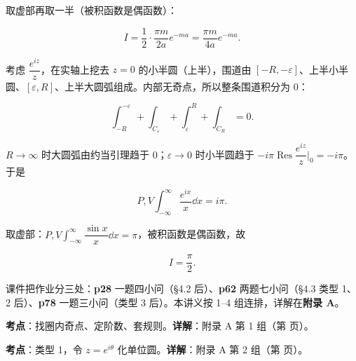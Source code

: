 \documentclass[11pt]{ctexart}
\renewcommand{\qbreak}{\needspace{0.45\textheight}}
\let\orighdr\hdr
\renewcommand{\hdr}[2]{\par\orighdr{#1}{#2}}
\begin{document}
取虚部再取一半（被积函数是偶函数）：

\[ I=\frac12\cdot\frac{\pi m}{2a}e^{-ma}=\frac{\pi m}{4a}e^{-ma} . \]


\qbreak
{}

考虑 $\dfrac{e^{iz}}{z}$，在实轴上挖去 $z=0$ 的小半圆（上半），围道由 $[-R,-\varepsilon]$、上半小半圆、$[\varepsilon,R]$、上半大圆弧组成。内部无奇点，所以整条围道积分为 0：

\[ \int_{-R}^{-\varepsilon}+\int_{C_\varepsilon}+\int_{\varepsilon}^{R}+\int_{C_R}=0 . \]

$R\to\infty$ 时大圆弧由约当引理趋于 0；$\varepsilon\to0$ 时小半圆趋于 $-i\pi\operatorname{Res}\dfrac{e^{iz}}{z}\Big|_{0}=-i\pi$。于是

\[ P,V\!\int_{-\infty}^{\infty}\frac{e^{ix}}{x}\dd x=i\pi . \]

取虚部：$P,V\!\int_{-\infty}^{\infty}\dfrac{\sin x}{x}\dd x=\pi$，被积函数是偶函数，故

\[ I=\frac{\pi}{2} . \]


课件把作业分三处：\textbf{p28} 一题四小问（§4.2 后）、\textbf{p62} 两题七小问（§4.3 类型 1、2 后）、\textbf{p78} 一题三小问（类型 3 后）。本讲义按 1--4 组连排，详解在\textbf{附录 A}。

\qbreak
{}

\textbf{考点}：找圈内奇点、定阶数、套规则。\quad \textbf{详解}：附录 A 第 1 组（第 \pageref{app:hw1} 页）。

\qbreak
{}

\textbf{考点}：类型 1，令 $z=e^{i\theta}$ 化单位圆。\quad \textbf{详解}：附录 A 第 2 组（第 \pageref{app:hw2} 页）。

\qbreak
{}
\end{document}
